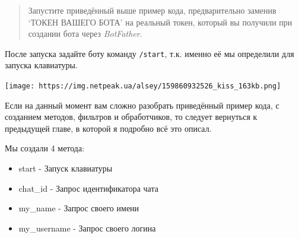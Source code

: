 \documentclass[
]{book}
\newenvironment{Shaded}{\begin{snugshade}}{\end{snugshade}}
\newcommand{\AttributeTok}[1]{\textcolor[rgb]{0.13,0.29,0.53}{#1}}
\newcommand{\CommentTok}[1]{\textcolor[rgb]{0.56,0.35,0.01}{\textit{#1}}}
\newcommand{\ErrorTok}[1]{\textcolor[rgb]{0.64,0.00,0.00}{\textbf{#1}}}
\newcommand{\FunctionTok}[1]{\textcolor[rgb]{0.13,0.29,0.53}{\textbf{#1}}}
\newcommand{\NormalTok}[1]{#1}
\newcommand{\OtherTok}[1]{\textcolor[rgb]{0.56,0.35,0.01}{#1}}
\newcommand{\SpecialCharTok}[1]{\textcolor[rgb]{0.81,0.36,0.00}{\textbf{#1}}}
\newcommand{\StringTok}[1]{\textcolor[rgb]{0.31,0.60,0.02}{#1}}
\providecommand{\tightlist}{%
  \setlength{\itemsep}{0pt}\setlength{\parskip}{0pt}}
\begin{document}
\begin{Shaded}
\end{Shaded}

\begin{quote}
Запустите приведённый выше пример кода, предварительно заменив `ТОКЕН ВАШЕГО БОТА' на реальный токен, который вы получили при создании бота через \emph{BotFather}.
\end{quote}

После запуска задайте боту команду \texttt{/start}, т.к. именно её мы определили для запуска клавиатуры.

\texttt{[image: https://img.netpeak.ua/alsey/159860932526\_kiss\_163kb.png]}

Если на данный момент вам сложно разобрать приведённый пример кода, с созданием методов, фильтров и обработчиков, то следует вернуться к предыдущей главе, в которой я подробно всё это описал.

Мы создали 4 метода:

\begin{itemize}
\tightlist
\item
  start - Запуск клавиатуры
\item
  chat\_id - Запрос идентификатора чата
\item
  my\_name - Запрос своего имени
\item
  my\_username - Запрос своего логина
\end{itemize}
\end{document}
